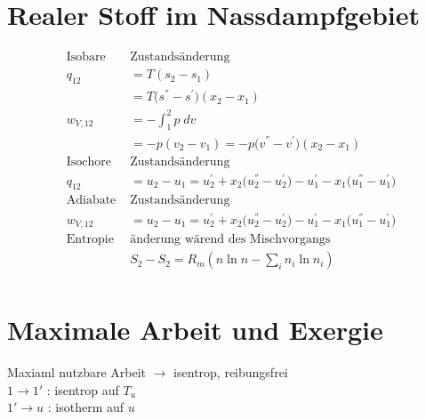 \documentclass[twocolumn]{article}
\begin{document}
\section{Realer Stoff im Nassdampfgebiet}
\begin{align*}
	\text{Isobare } &\text{Zustandsänderung} \\
	q_{12} &= T(s_2 - s_1) \\
	&= T\Big(s^{''} - s^{'}\Big)(x_2-x_1) \\
	w_{V,12} &= - \int_{1}^{2} p\; dv \\
	&= -p(v_2-v_1) = -p\Big(v^{''} -v^{'}\Big)(x_2-x_1) \\
	\text{Isochore } &\text{Zustandsänderung} \\
	q_{12} &= u_2 - u_1 = u_2^{'} + x_2\Big(u_2^{''} - u_2^{'} \Big) - u_1^{'} - x_1\Big(u_1^{''} - u_1^{'}\Big) \\
	\text{Adiabate } &\text{Zustandsänderung} \\
	w_{V,12} &= u_2 - u_1 = u_2^{'} + x_2 \Big( u_2^{''} - u_2^{'} \Big) - u_1^{'} - x_1\Big(u_1^{''} - u_1^{'}\Big) \\
	\text{Entropie} & \text{änderung wärend des Mischvorgangs} \\
	&S_2-S_2 = R_m \left ( n \ln n - \sum_{i}^{} n_i \ln n_i \right ) \\
\end{align*}


\section{Maximale Arbeit und Exergie}
Maxiaml nutzbare Arbeit $\rightarrow$ isentrop, reibungsfrei \\
$1 \rightarrow 1'$ : isentrop auf $T_u$ \\
$1' \rightarrow u$ : isotherm auf $u$ 
\end{document}
